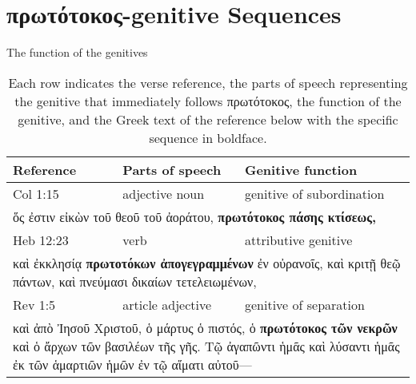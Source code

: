 \section{πρωτότοκος-genitive Sequences}

The function of the genitives 

\begin{table}
\begin{tabular}[l]{*3l}
	\toprule
	\textbf{Reference} & \textbf{Parts of speech} & \textbf{Genitive function} \\
	\midrule

	Col 1:15 & adjective noun & genitive of subordination \\
	\multicolumn{3}{p{\linewidth}}{ὅς ἐστιν εἰκὼν τοῦ θεοῦ τοῦ ἀοράτου, \textbf{πρωτότοκος πάσης κτίσεως,}} \\
	\midrule
	
	Heb 12:23 & verb & attributive genitive \\
	\multicolumn{3}{p{\linewidth}}{καὶ ἐκκλησίᾳ \textbf{πρωτοτόκων ἀπογεγραμμένων} ἐν οὐρανοῖς, καὶ κριτῇ θεῷ πάντων, καὶ πνεύμασι δικαίων τετελειωμένων,}\\
	\midrule

	Rev 1:5 & article adjective & genitive of separation \\
	\multicolumn{3}{p{\linewidth}}{καὶ ἀπὸ Ἰησοῦ Χριστοῦ, ὁ μάρτυς ὁ πιστός, ὁ \textbf{πρωτότοκος τῶν νεκρῶν} καὶ ὁ ἄρχων τῶν βασιλέων τῆς γῆς. Τῷ ἀγαπῶντι ἡμᾶς καὶ λύσαντι ἡμᾶς ἐκ τῶν ἁμαρτιῶν ἡμῶν ἐν τῷ αἵματι αὐτοῦ—}\\

	\bottomrule
\end{tabular}
\label{t1}
\caption{Each row indicates the verse reference, the parts of speech representing the genitive that immediately follows πρωτότοκος, the function of the genitive, and the Greek text of the reference below with the specific sequence in boldface.}
\end{table}